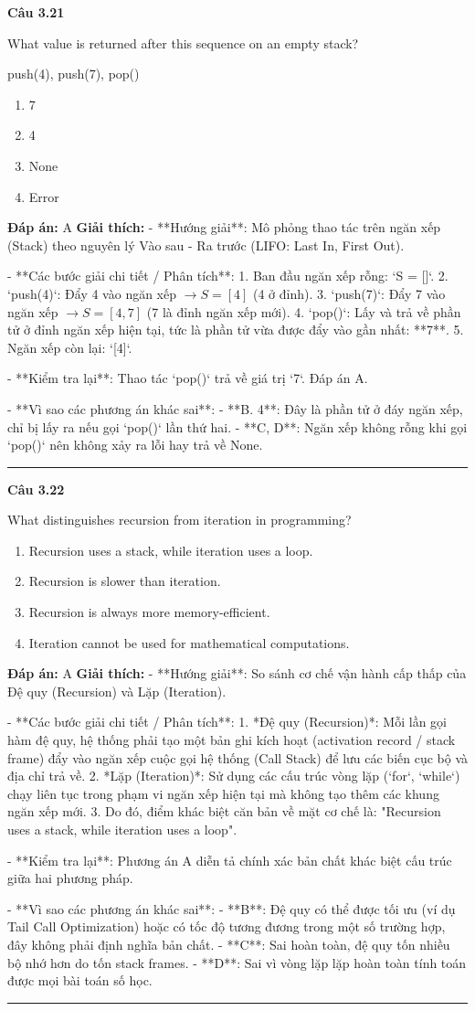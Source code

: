 \documentclass[11pt,a4paper]{article}
\newenvironment{question}[1]{%
  \par\vspace{1em}\noindent\textbf{\large Câu #1}\par\vspace{0.4em}
}{%
  \par\vspace{1em}\hrule\vspace{0.6em}
}
\newenvironment{choices}{%
  \begin{enumerate}[label=\textbf{\Alph*.},leftmargin=2.2em,itemsep=2pt,topsep=3pt]
}{%
  \end{enumerate}
}
\newcommand{\choice}{\item}
\newenvironment{codebox}{%
  \begin{tcolorbox}[colback=gray!8!white,colframe=gray!50!black,arc=1.5mm,boxrule=0.6pt,left=3mm,right=3mm,top=2.5mm,bottom=2.5mm]
  \ttfamily\small
}{%
  \end{tcolorbox}
}
\begin{document}
\begin{question}{3.21}
What value is returned after this sequence on an empty stack?
\begin{codebox}
push(4), push(7), pop()
\end{codebox}
\begin{choices}
\choice 7
\choice 4
\choice None
\choice Error
\end{choices}
\textbf{Đáp án:} A
\textbf{Giải thích:} - **Hướng giải**:
  Mô phỏng thao tác trên ngăn xếp (Stack) theo nguyên lý Vào sau - Ra trước (LIFO: Last In, First Out).

- **Các bước giải chi tiết / Phân tích**:
  1. Ban đầu ngăn xếp rỗng: `S = []`.
  2. `push(4)`: Đẩy 4 vào ngăn xếp \(\rightarrow S = [4]\) (4 ở đỉnh).
  3. `push(7)`: Đẩy 7 vào ngăn xếp \(\rightarrow S = [4, 7]\) (7 là đỉnh ngăn xếp mới).
  4. `pop()`: Lấy và trả về phần tử ở đỉnh ngăn xếp hiện tại, tức là phần tử vừa được đẩy vào gần nhất: **7**.
  5. Ngăn xếp còn lại: `[4]`.

- **Kiểm tra lại**:
  Thao tác `pop()` trả về giá trị `7`. Đáp án A.

- **Vì sao các phương án khác sai**:
  - **B. 4**: Đây là phần tử ở đáy ngăn xếp, chỉ bị lấy ra nếu gọi `pop()` lần thứ hai.
  - **C, D**: Ngăn xếp không rỗng khi gọi `pop()` nên không xảy ra lỗi hay trả về None.
\end{question}

\begin{question}{3.22}
What distinguishes recursion from iteration in programming?
\begin{choices}
\choice Recursion uses a stack, while iteration uses a loop.
\choice Recursion is slower than iteration.
\choice Recursion is always more memory-efficient.
\choice Iteration cannot be used for mathematical computations.
\end{choices}
\textbf{Đáp án:} A
\textbf{Giải thích:} - **Hướng giải**:
  So sánh cơ chế vận hành cấp thấp của Đệ quy (Recursion) và Lặp (Iteration).

- **Các bước giải chi tiết / Phân tích**:
  1. *Đệ quy (Recursion)*: Mỗi lần gọi hàm đệ quy, hệ thống phải tạo một bản ghi kích hoạt (activation record / stack frame) đẩy vào ngăn xếp cuộc gọi hệ thống (Call Stack) để lưu các biến cục bộ và địa chỉ trả về.
  2. *Lặp (Iteration)*: Sử dụng các cấu trúc vòng lặp (`for`, `while`) chạy liên tục trong phạm vi ngăn xếp hiện tại mà không tạo thêm các khung ngăn xếp mới.
  3. Do đó, điểm khác biệt căn bản về mặt cơ chế là: "Recursion uses a stack, while iteration uses a loop".

- **Kiểm tra lại**:
  Phương án A diễn tả chính xác bản chất khác biệt cấu trúc giữa hai phương pháp.

- **Vì sao các phương án khác sai**:
  - **B**: Đệ quy có thể được tối ưu (ví dụ Tail Call Optimization) hoặc có tốc độ tương đương trong một số trường hợp, đây không phải định nghĩa bản chất.
  - **C**: Sai hoàn toàn, đệ quy tốn nhiều bộ nhớ hơn do tốn stack frames.
  - **D**: Sai vì vòng lặp lặp hoàn toàn tính toán được mọi bài toán số học.
\end{question}
\end{document}
